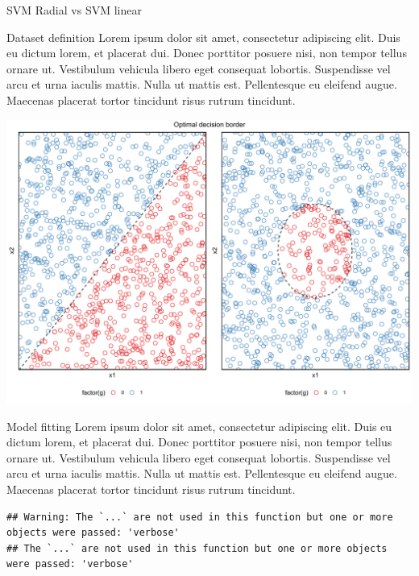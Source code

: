 \documentclass[
  ignorenonframetext,
]{article}
\begin{document}
\begin{frame}[fragile]{SVM Radial vs SVM linear}
\protect\hypertarget{svm-radial-vs-svm-linear-1}{}
\begin{block}{Dataset definition}
\protect\hypertarget{dataset-definition-5}{}
Lorem ipsum dolor sit amet, consectetur adipiscing elit. Duis eu dictum lorem, et placerat dui. Donec porttitor posuere nisi, non tempor tellus ornare ut. Vestibulum vehicula libero eget consequat lobortis. Suspendisse vel arcu et urna iaculis mattis. Nulla ut mattis est. Pellentesque eu eleifend augue. Maecenas placerat tortor tincidunt risus rutrum tincidunt.

\begin{center}\includegraphics{_main_files/figure-beamer/unnamed-chunk-77-1} \end{center}
\end{block}

\begin{block}{Model fitting}
\protect\hypertarget{model-fitting-5}{}
Lorem ipsum dolor sit amet, consectetur adipiscing elit. Duis eu dictum lorem, et placerat dui. Donec porttitor posuere nisi, non tempor tellus ornare ut. Vestibulum vehicula libero eget consequat lobortis. Suspendisse vel arcu et urna iaculis mattis. Nulla ut mattis est. Pellentesque eu eleifend augue. Maecenas placerat tortor tincidunt risus rutrum tincidunt.

\begin{verbatim}
## Warning: The `...` are not used in this function but one or more objects were passed: 'verbose'
## The `...` are not used in this function but one or more objects were passed: 'verbose'
\end{verbatim}


\end{block}
\end{frame}
\end{document}
